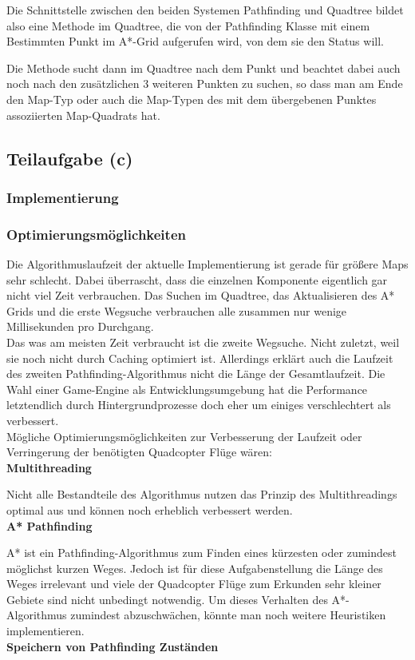\documentclass[a4paper,12pt]{article}
\begin{document}
Die Schnittstelle zwischen den beiden Systemen Pathfinding und Quadtree bildet also eine Methode im Quadtree, die von der Pathfinding Klasse mit einem Bestimmten Punkt im A*-Grid aufgerufen wird, von dem sie den Status will.

Die Methode sucht dann im Quadtree nach dem Punkt und beachtet dabei auch noch nach den zusätzlichen 3 weiteren Punkten zu suchen, so dass man am Ende den Map-Typ oder auch die Map-Typen des mit dem übergebenen Punktes assoziierten Map-Quadrats hat.

\subsection{Teilaufgabe (c)}
\subsubsection{Implementierung}
\subsubsection{Optimierungsmöglichkeiten}
Die Algorithmuslaufzeit der aktuelle Implementierung ist gerade für größere Maps sehr schlecht. Dabei überrascht, dass die einzelnen Komponente eigentlich gar nicht viel Zeit verbrauchen. Das Suchen im Quadtree, das Aktualisieren des A* Grids und die erste Wegsuche verbrauchen alle zusammen nur wenige Millisekunden pro Durchgang. 
\\[0.4cm]
Das was am meisten Zeit verbraucht ist die zweite Wegsuche. Nicht zuletzt, weil sie noch nicht durch Caching optimiert ist. Allerdings erklärt auch die Laufzeit des zweiten Pathfinding-Algorithmus nicht die Länge der Gesamtlaufzeit. Die Wahl einer Game-Engine als Entwicklungsumgebung hat die Performance letztendlich durch Hintergrundprozesse doch eher um einiges verschlechtert als verbessert.
\\[0.4cm]
Mögliche Optimierungsmöglichkeiten zur Verbesserung der Laufzeit oder Verringerung der benötigten Quadcopter Flüge wären:
\\[0.4cm]
\textbf{Multithreading}

Nicht alle Bestandteile des Algorithmus nutzen das Prinzip des Multithreadings optimal aus und können noch erheblich verbessert werden.
\\[0.4cm]
\textbf{A* Pathfinding}

A* ist ein Pathfinding-Algorithmus zum Finden eines kürzesten oder zumindest möglichst kurzen Weges. Jedoch ist für diese Aufgabenstellung die Länge des Weges irrelevant und viele der Quadcopter Flüge zum Erkunden sehr kleiner Gebiete sind nicht unbedingt notwendig. Um dieses Verhalten des A*-Algorithmus zumindest abzuschwächen, könnte man noch weitere Heuristiken implementieren.
\\[0.4cm]
\textbf{Speichern von Pathfinding Zuständen}
\end{document}
